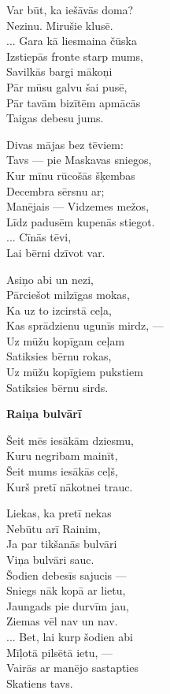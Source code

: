 \documentclass[14pt]{extarticle}
\begin{document}
{{Var būt, ka iešāvās doma?\\
Nezinu. Mirušie klusē.\\
... Gara kā liesmaina čūska\\
Izstiepās fronte starp mums,\\
Savilkās bargi mākoņi\\
Pār mūsu galvu šai pusē,\\
Pār tavām bizītēm apmācās\\
Taigas debesu jums.

Divas mājas bez tēviem:\\
Tavs --- pie Maskavas sniegos,\\
Kur mīnu rūcošās šķembas\\
Decembra sērsnu ar;\\
Manējais --- Vidzemes mežos,\\
Līdz padusēm kupenās stiegot.\\
... Cīnās tēvi,\\
Lai bērni dzīvot var. 

Asiņo abi un nezi,\\
Pārciešot milzīgas mokas,\\
Ka uz to izcirstā ceļa,\\
Kas sprādzienu ugunīs mirdz, ---\\
Uz mūžu kopīgam ceļam\\
Satiksies bērnu rokas,\\
Uz mūžu kopīgiem pukstiem\\
Satiksies bērnu sirds. 


\newpage

{\bf Raiņa bulvārī}

Šeit mēs iesākām dziesmu,\\
Kuru negribam mainīt,\\
Šeit mums iesākās ceļš,\\
Kurš pretī nākotnei trauc. 

Liekas, ka pretī nekas\\
Nebūtu arī Rainim,\\
Ja par tikšanās bulvāri\\
Viņa bulvāri sauc.\\
Šodien debesīs sajucis ---\\
Sniegs nāk kopā ar lietu,\\
Jaungads pie durvīm jau,\\
Ziemas vēl nav un nav.\\
... Bet, lai kurp šodien abi\\
Mīļotā pilsētā ietu, ---\\
Vairās ar manējo sastapties\\
Skatiens tavs. 

}}
\end{document}
